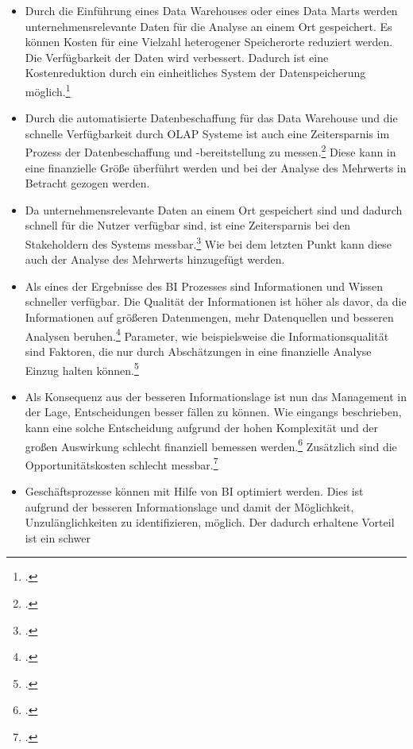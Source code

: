 \begin{itemize}
    \item Durch die Einführung eines Data Warehouses oder eines Data Marts werden unternehmensrelevante Daten für die Analyse
    an einem Ort gespeichert. Es können Kosten für eine Vielzahl heterogener Speicherorte reduziert werden. Die Verfügbarkeit
    der Daten wird verbessert. Dadurch ist eine Kostenreduktion durch ein einheitliches System der Datenspeicherung
    möglich.\footcite[Cf.][p. 105]{azma2012business}
    \item Durch die automatisierte Datenbeschaffung für das Data Warehouse und die schnelle Verfügbarkeit durch \ac{OLAP} Systeme
    ist auch eine Zeitersparnis im Prozess der Datenbeschaffung und -bereitstellung zu messen.\footcite[Cf.][p. 51]{horakova2013business}
    Diese kann in eine finanzielle Größe überführt werden und bei der Analyse des Mehrwerts in Betracht gezogen werden.
    \item Da unternehmensrelevante Daten an einem Ort gespeichert sind und dadurch schnell für die Nutzer verfügbar sind,
    ist eine Zeitersparnis bei den Stakeholdern des Systems messbar.\footcite[Cf.][p. 97]{williams2003business} Wie bei dem
    letzten Punkt kann diese auch der Analyse des Mehrwerts hinzugefügt werden.
    \item Als eines der Ergebnisse des BI Prozesses sind Informationen und Wissen schneller verfügbar. Die Qualität der
    Informationen ist höher als davor, da die Informationen auf größeren Datenmengen, mehr Datenquellen und besseren Analysen
    beruhen.\footcite[Cf.][p. 51]{horakova2013business} Parameter, wie beispielsweise die Informationsqualität sind Faktoren,
    die nur durch Abschätzungen in eine finanzielle Analyse Einzug halten können.\footcite[Cf.][p. 51]{horakova2013business}
    \item Als Konsequenz aus der besseren Informationslage ist nun das Management in der Lage, Entscheidungen besser fällen
    zu können. Wie eingangs beschrieben, kann eine solche Entscheidung aufgrund der hohen Komplexität und der großen Auswirkung
    schlecht finanziell bemessen werden.\footcite[Cf.][p. 51]{horakova2013business} Zusätzlich sind die Opportunitätskosten
    schlecht messbar.\footcite[Cf.][p. 99]{hovcevar2010assessing}
    \item Geschäftsprozesse können mit Hilfe von \ac{BI} optimiert werden. Dies ist aufgrund der besseren Informationslage und
    damit der Möglichkeit, Unzulänglichkeiten zu identifizieren, möglich. Der dadurch erhaltene Vorteil ist ein schwer

\end{itemize}
